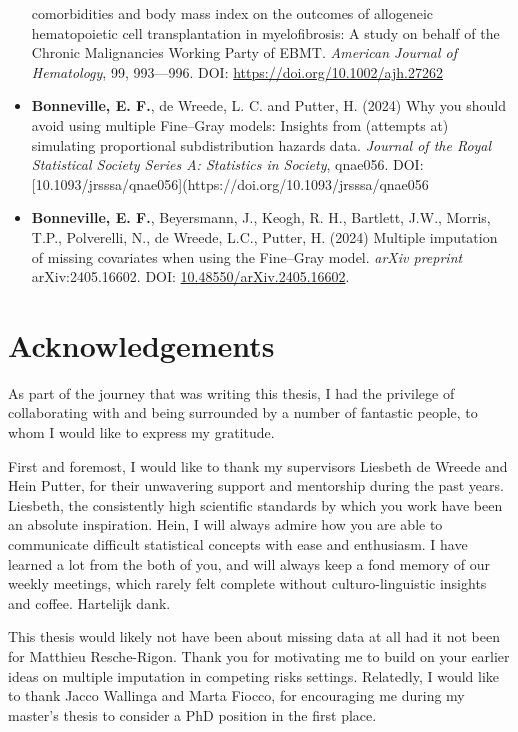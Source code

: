 \documentclass[
  letterpaper,
  paper=240mm:170mm,
  twoside=true,
  open=right,
  fontsize=10pt,
  pagesize=false,
  BCOR=15mm,
  DIV=14,
  headinclude=true,
  footinclude=false,
  headsepline=on]{scrbook}
\begin{document}
\begin{itemize}
  comorbidities and body mass index on the outcomes of allogeneic
  hematopoietic cell transplantation in myelofibrosis: A study on behalf
  of the Chronic Malignancies Working Party of EBMT. \emph{American
  Journal of Hematology}, 99, 993---996. DOI:
  \url{https://doi.org/10.1002/ajh.27262}
\item
  \textbf{Bonneville, E. F.}, de Wreede, L. C. and Putter, H. (2024) Why
  you should avoid using multiple Fine--Gray models: Insights from
  (attempts at) simulating proportional subdistribution hazards data.
  \emph{Journal of the Royal Statistical Society Series A: Statistics in
  Society}, qnae056. DOI:
  {[}10.1093/jrsssa/qnae056{]}(https://doi.org/10.1093/jrsssa/qnae056
\item
  \textbf{Bonneville, E. F.}, Beyersmann, J., Keogh, R. H., Bartlett,
  J.W., Morris, T.P., Polverelli, N., de Wreede, L.C., Putter, H. (2024)
  Multiple imputation of missing covariates when using the Fine--Gray
  model. \emph{arXiv preprint} arXiv:2405.16602. DOI:
  \href{https://doi.org/10.48550/arXiv.2405.16602}{10.48550/arXiv.2405.16602}.
\end{itemize}


\chapter*{Acknowledgements}\label{acknowledgements}


As part of the journey that was writing this thesis, I had the privilege
of collaborating with and being surrounded by a number of fantastic
people, to whom I would like to express my gratitude.

First and foremost, I would like to thank my supervisors Liesbeth de
Wreede and Hein Putter, for their unwavering support and mentorship
during the past years. Liesbeth, the consistently high scientific
standards by which you work have been an absolute inspiration. Hein, I
will always admire how you are able to communicate difficult statistical
concepts with ease and enthusiasm. I have learned a lot from the both of
you, and will always keep a fond memory of our weekly meetings, which
rarely felt complete without culturo-linguistic insights and coffee.
Hartelijk dank.

This thesis would likely not have been about missing data at all had it
not been for Matthieu Resche-Rigon. Thank you for motivating me to build
on your earlier ideas on multiple imputation in competing risks
settings. Relatedly, I would like to thank Jacco Wallinga and Marta
Fiocco, for encouraging me during my master's thesis to consider a PhD
position in the first place.
\end{document}
